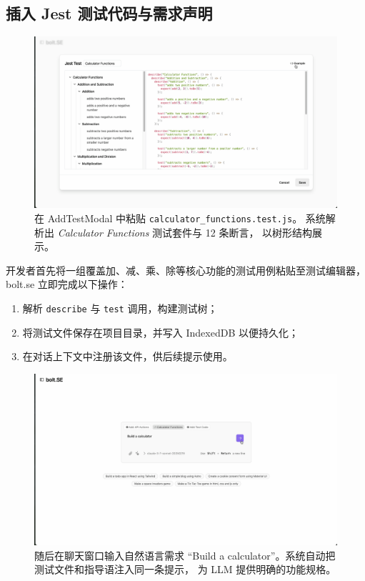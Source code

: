 \subsection{插入 Jest 测试代码与需求声明}

\begin{figure}[htbp]
  \centering
  \includegraphics[width=.9\textwidth]{figures/screenshots/tdd/add_test_modal.png}
  \caption{在 AddTestModal 中粘贴 \texttt{calculator\_functions.test.js}。
           系统解析出 \textit{Calculator Functions} 测试套件与 12 条断言，
           以树形结构展示。}
  \label{fig:tdd_add_test}
\end{figure}

开发者首先将一组覆盖加、减、乘、除等核心功能的测试用例粘贴至测试编辑器，
bolt.se 立即完成以下操作：

\begin{enumerate}
  \item 解析 \verb|describe| 与 \verb|test| 调用，构建测试树；
  \item 将测试文件保存在项目目录，并写入 IndexedDB 以便持久化；
  \item 在对话上下文中注册该文件，供后续提示使用。
\end{enumerate}

\begin{figure}[htbp]
  \centering
  \includegraphics[width=.9\textwidth]{figures/screenshots/tdd/calculator_prompt.png}
  \caption{随后在聊天窗口输入自然语言需求
           “Build a calculator”。系统自动把测试文件和指导语注入同一条提示，
           为 LLM 提供明确的功能规格。}
  \label{fig:tdd_prompt}
\end{figure}

